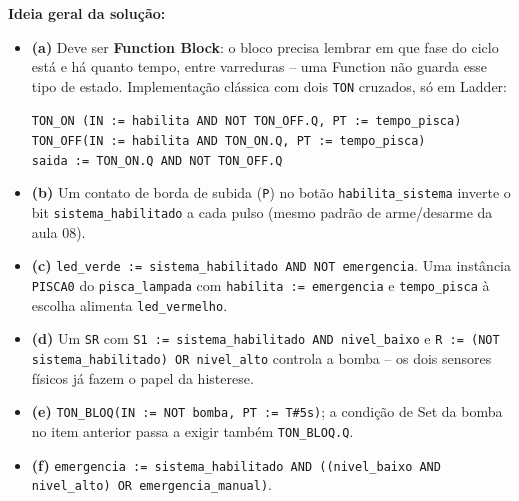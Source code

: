 \begin{solution}
\textbf{Ideia geral da solução:}
\begin{itemize}
  \item \textbf{(a)} Deve ser \textbf{Function Block}: o bloco precisa
  lembrar em que fase do ciclo está e há quanto tempo, entre varreduras
  -- uma Function não guarda esse tipo de estado. Implementação clássica
  com dois \texttt{TON} cruzados, só em Ladder:
  \begin{center}
  \texttt{TON\_ON (IN := habilita AND NOT TON\_OFF.Q, PT := tempo\_pisca)} \\
  \texttt{TON\_OFF(IN := habilita AND TON\_ON.Q,      PT := tempo\_pisca)} \\
  \texttt{saida := TON\_ON.Q AND NOT TON\_OFF.Q}
  \end{center}
  \item \textbf{(b)} Um contato de borda de subida (\texttt{P}) no botão
  \texttt{habilita\_sistema} inverte o bit \texttt{sistema\_habilitado}
  a cada pulso (mesmo padrão de arme/desarme da aula 08).
  \item \textbf{(c)} \texttt{led\_verde := sistema\_habilitado AND NOT
  emergencia}. Uma instância \texttt{PISCA0} do \texttt{pisca\_lampada}
  com \texttt{habilita := emergencia} e \texttt{tempo\_pisca} à escolha
  alimenta \texttt{led\_vermelho}.
  \item \textbf{(d)} Um \texttt{SR} com \texttt{S1 := sistema\_habilitado
  AND nivel\_baixo} e \texttt{R := (NOT sistema\_habilitado) OR
  nivel\_alto} controla a bomba -- os dois sensores físicos já fazem o
  papel da histerese.
  \item \textbf{(e)} \texttt{TON\_BLOQ(IN := NOT bomba, PT :=
  T\#5s)}; a condição de Set da bomba no item anterior passa a exigir
  também \texttt{TON\_BLOQ.Q}.
  \item \textbf{(f)} \texttt{emergencia := sistema\_habilitado AND
  ((nivel\_baixo AND nivel\_alto) OR emergencia\_manual)}.
\end{itemize}
\end{solution}

